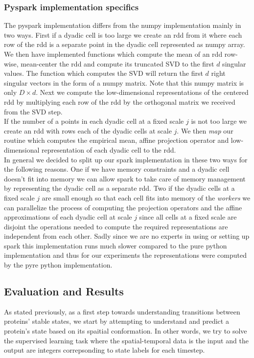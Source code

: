 \documentclass{article}
\begin{document}
	\subsubsection{Pyspark implementation specifics}
	The pyspark implementation differs from the numpy implementation mainly in two ways. First if a dyadic cell is too large we create an rdd from it where each row of the rdd is a separate point in the dyadic cell represented as numpy array. We then have implemented functions which compute the mean of an rdd row-wise, mean-center the rdd and compute its truncated SVD to the first $d$ singular values. The function which computes the SVD will return the first $d$ right singular vectors in the form of a numpy matrix. Note that this numpy matrix is only $D\times d$. Next we compute the low-dimensional representations of the centered rdd by multiplying each row of the rdd by the orthogonal matrix we received from the SVD step.\\
	If the number of a points in each dyadic cell at a fixed scale $j$ is not too large we create an rdd with rows each of the dyadic cells at scale $j$. We then \textit{map} our routine which computes the empirical mean, affine projection operator and low-dimensional representation of each dyadic cell to the rdd.\\
	In general we decided to split up our spark implementation in these two ways for the following reasons. One if we have memory constraints and a dyadic cell doesn't fit into memory we can allow spark to take care of memory management by representing the dyadic cell as a separate rdd. Two if the dyadic cells at a fixed scale $j$ are small enough so that each cell fits into memory of the \textit{workers} we can parallelize the process of computing the projection operators and the affine approximations of each dyadic cell at scale $j$ since all cells at a fixed scale are disjoint the operations needed to compute the required representations are independent from each other. Sadly since we are no experts in using or setting up spark this implementation runs much slower compared to the pure python implementation and thus for our experiments the representations were computed by the pyre python implementation.
	
	\subsection{Evaluation and Results}
	
	As stated previously, as a first step towards understanding transitions between proteins' stable states, we start by attempting to understand and predict a protein's state based on its spaitial conformation. In other words, we try to solve the supervised learning task where the spatial-temporal data is the input and the output are integers correpsonding to state labels for each timestep.
	
\end{document}
